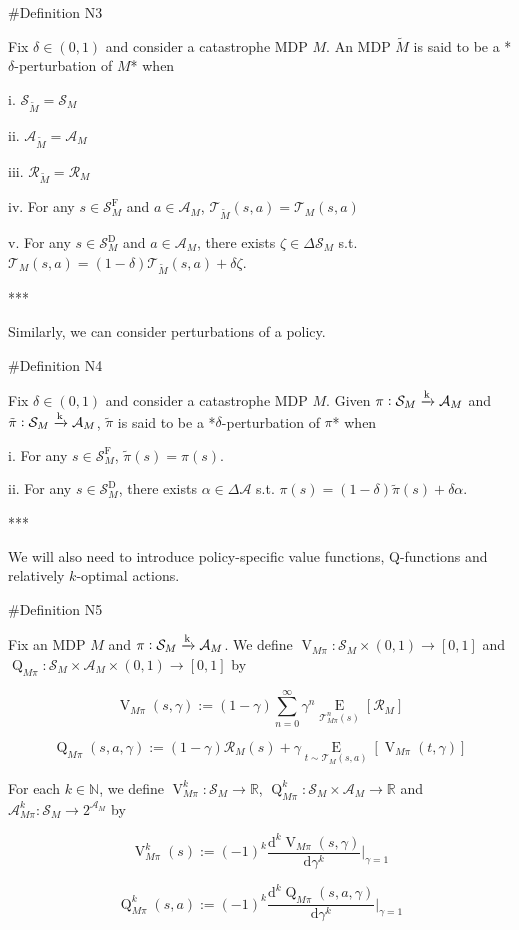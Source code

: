 \documentclass[a4paper]{article}
\newcommand{\AP}[1]{\left(#1\right)}
\newcommand{\AB}[1]{\left[#1\right]}
\newcommand{\Ea}[2]{\underset{#1}{\operatorname{E}}\AB{#2}}
\newcommand{\D}{\mathrm{d}}
\newcommand{\Nats}{\mathbb{N}}
\newcommand{\Reals}{\mathbb{R}}
\newcommand{\M}{\xrightarrow{\textnormal{k}}}
\newcommand{\A}{\mathcal{A}}
\newcommand{\St}{\mathcal{S}}
\newcommand{\T}{\mathcal{T}}
\newcommand{\R}{\mathcal{R}}
\newcommand{\RMD}{\mathrm{D}}
\newcommand{\RMF}{\mathrm{F}}
\newcommand{\SF}{\St^{\RMF}}
\newcommand{\SD}{\St^{\RMD}}
\newcommand{\V}{\operatorname{V}}
\newcommand{\Q}{\operatorname{Q}}
\begin{document}
\#Definition N3

Fix $\delta\in(0,1)$ and consider a catastrophe MDP $M$. An MDP $\tilde{M}$ is said to be a *$\delta$-perturbation of $M$* when

i. $\St_{\tilde{M}} = \St_M$

ii. $\A_{\tilde{M}} = \A_M$

iii. $\R_{\tilde{M}}=\R_M$

iv. For any $s \in \SF_M$ and $a \in \A_M$, $\T_{\tilde{M}}\AP{s,a}=\T_{M}\AP{s,a}$

v. For any $s \in \SD_M$ and $a \in \A_M$, there exists $\zeta \in \Delta\St_M$ s.t. $\T_{M}\AP{s,a}=(1-\delta)\T_{\tilde{M}}\AP{s,a}+\delta\zeta$.

***

Similarly, we can consider perturbations of a policy.

\#Definition N4

Fix $\delta\in(0,1)$ and consider a catastrophe MDP $M$. Given $\pi: \St_M \M \A_M$ and $\tilde{\pi}: \St_M \M \A_M$, $\tilde{\pi}$ is said to be a *$\delta$-perturbation of $\pi$* when

i. For any $s \in \SF_M$, $\tilde{\pi}(s) = \pi(s)$.

ii. For any $s \in \SD_M$, there exists $\alpha\in\Delta\A$ s.t. $\pi(s)=(1-\delta)\tilde{\pi}(s)+\delta\alpha$.

***

We will also need to introduce policy-specific value functions, Q-functions and relatively $k$-optimal actions.

\#Definition N5

Fix an MDP $M$ and $\pi: \St_M \M \A_M$. We define $\V_{M\pi}: \St_M \times (0,1) \rightarrow [0,1]$ and $\Q_{M\pi}: \St_M \times \A_M \times (0,1) \rightarrow [0,1]$ by

$$\V_{M\pi}(s,\gamma) := (1-\gamma) \sum_{n=0}^\infty \gamma^n \Ea{\T_{M\pi}^n(s)}{\R_M}$$

$$\Q_{M\pi}(s,a,\gamma) := (1-\gamma) \R_M(s) + \gamma \Ea{t \sim \T_{M}(s,a)}{\V_{M\pi}(t,\gamma)}$$

For each $k \in \Nats$, we define $\V_{M\pi}^k: \St_M \rightarrow \Reals$, $\Q_{M\pi}^k: \St_M \times \A_M \rightarrow \Reals$ and $\A_{M\pi}^k: \St_M \rightarrow 2^{\A_M}$ by

$$\V_{M\pi}^k(s) := (-1)^k \frac{\D^k \V_{M\pi}(s,\gamma)}{\D\gamma^k}\bigg\vert_{\gamma=1}$$

$$\Q_{M\pi}^k(s,a) := (-1)^k \frac{\D^k \Q_{M\pi}(s,a,\gamma)}{\D\gamma^k}\bigg\vert_{\gamma=1}$$
\end{document}
